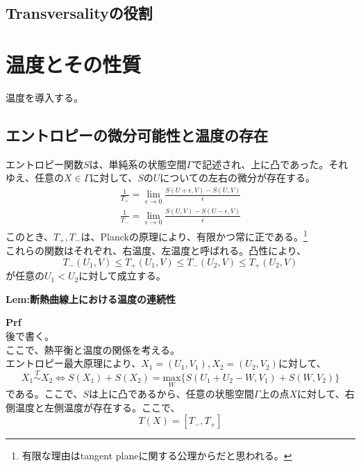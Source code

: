 \documentclass[a4paper,11pt]{jsarticle}
\numberwithin{equation}{section}
\begin{document}
\subsection{Transversalityの役割}

\newpage
\section{温度とその性質}
温度を導入する。\\
\subsection{エントロピーの微分可能性と温度の存在}
エントロピー関数$S$は、単純系の状態空間$\Gamma$で記述され、上に凸であった。それゆえ、任意の$X \in \Gamma$に対して、$S$の$U$についての左右の微分が存在する。\\
\begin{align}
    \frac{1}{T_+} =\lim_{\epsilon \to 0} \frac{S(U+\epsilon,V)-S(U,V)}{\epsilon}\\
    \frac{1}{T_-} =\lim_{\epsilon \to 0} \frac{S(U,V)-S(U-\epsilon,V)}{\epsilon}
\end{align}
このとき、$T_+,T_-$は、Planckの原理により、有限かつ常に正である。\footnote{有限な理由はtangent planeに関する公理からだと思われる。}\\
これらの関数はそれぞれ、右温度、左温度と呼ばれる。凸性により、
\begin{equation}
    T_-(U_1,V) \leq T_+(U_1,V) \leq T_-(U_2,V) \leq T_+(U_2,V)
\end{equation}
が任意の$U_1<U_2$に対して成立する。\\

\begin{itembox}[l]{\textbf{Lem:断熱曲線上における温度の連続性}}


\end{itembox}
\textbf{Prf}\\
後で書く。\hfill\qedsymbol\\

ここで、熱平衡と温度の関係を考える。\\
エントロピー最大原理により、$X_1=(U_1,V_1),X_2=(U_2,V_2)$に対して、
\begin{equation}
    X_1 \overset{T}{\sim} X_2 \Leftrightarrow S(X_1) +S(X_2) =\underset{W}{\text{max}}\{S(U_1+U_2-W,V_1)+S(W,V_2)\}
\end{equation}
である。ここで、$S$は上に凸であるから、任意の状態空間$\Gamma$上の点$X$に対して、右側温度と左側温度が存在する。ここで、
\begin{equation}
    T(X) = [T_-,T_+]
\end{equation}
\end{document}
